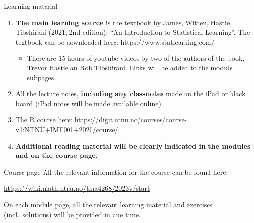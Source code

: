 \documentclass[
  10pt,
  ignorenonframetext,
]{beamer}
\providecommand{\tightlist}{%
  \setlength{\itemsep}{0pt}\setlength{\parskip}{0pt}}
\begin{document}
\begin{frame}{Learning material}
\protect\hypertarget{learning-material}{}
\begin{enumerate}
[1)]
\item
  \textbf{The main learning source} is the textbook by James, Witten,
  Hastie, Tibshirani (2021, 2nd edition): ``An Introduction to
  Statistical Learning''. The textbook can be downloaded here:
  \url{https://www.statlearning.com/}

  \begin{itemize}
  \tightlist
  \item
    There are 15 hours of youtube videos by two of the authors of the
    book, Trevor Hastie an Rob Tibshirani. Links will be added to the
    module subpages.
  \end{itemize}
\item
  All the lecture notes, \textbf{including any classnotes} made on the
  iPad or black board (iPad notes will be made available online).
\item
  The R course here:
  \url{https://digit.ntnu.no/courses/course-v1:NTNU+IMF001+2020/course/}
\item
  \textbf{Additional reading material will be clearly indicated in the
  modules and on the course page.}
\end{enumerate}
\end{frame}

\begin{frame}{Course page}
\protect\hypertarget{course-page}{}
All the relevant information for the course can be found here:

\url{https://wiki.math.ntnu.no/tma4268/2023v/start}

On each module page, all the relevant learning material and exercises
(incl.~solutions) will be provided in due time.
\end{frame}
\end{document}
